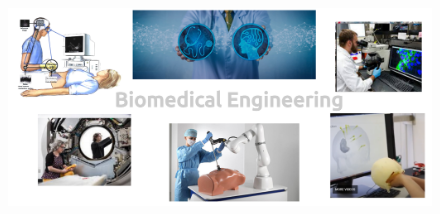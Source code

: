 %
%



{
\begin{frame}{}

  \begin{figure}
  \centering
  \includegraphics[width=1.0\textwidth]{./../figures/biomedical-engineer/versions/drawing-v03}
  \end{figure}

\end{frame}
}

